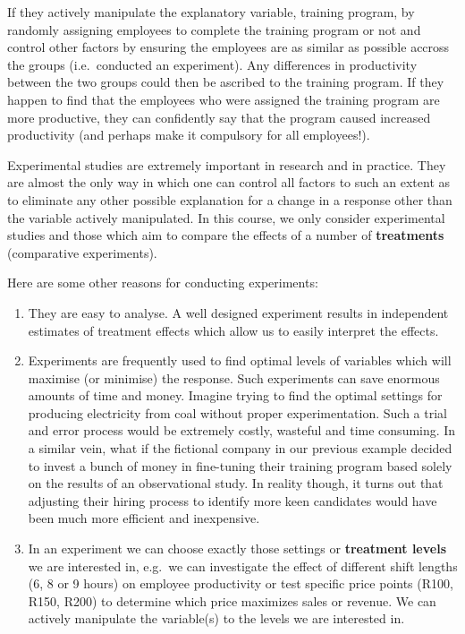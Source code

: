 \documentclass[
  letterpaper,
]{book}
\begin{document}
If they actively manipulate the explanatory variable, training program,
by randomly assigning employees to complete the training program or not
and control other factors by ensuring the employees are as similar as
possible accross the groups (i.e.~conducted an experiment). Any
differences in productivity between the two groups could then be
ascribed to the training program. If they happen to find that the
employees who were assigned the training program are more productive,
they can confidently say that the program caused increased productivity
(and perhaps make it compulsory for all employees!).

Experimental studies are extremely important in research and in
practice. They are almost the only way in which one can control all
factors to such an extent as to eliminate any other possible explanation
for a change in a response other than the variable actively manipulated.
In this course, we only consider experimental studies and those which
aim to compare the effects of a number of \textbf{treatments}
(comparative experiments).

Here are some other reasons for conducting experiments:

\begin{enumerate}
\def\labelenumi{\arabic{enumi}.}
\item
  They are easy to analyse. A well designed experiment results in
  independent estimates of treatment effects which allow us to easily
  interpret the effects.
\item
  Experiments are frequently used to find optimal levels of variables
  which will maximise (or minimise) the response. Such experiments can
  save enormous amounts of time and money. Imagine trying to find the
  optimal settings for producing electricity from coal without proper
  experimentation. Such a trial and error process would be extremely
  costly, wasteful and time consuming. In a similar vein, what if the
  fictional company in our previous example decided to invest a bunch of
  money in fine-tuning their training program based solely on the
  results of an observational study. In reality though, it turns out
  that adjusting their hiring process to identify more keen candidates
  would have been much more efficient and inexpensive.
\item
  In an experiment we can choose exactly those settings or
  \textbf{treatment levels} we are interested in, e.g.~we can
  investigate the effect of different shift lengths (6, 8 or 9 hours) on
  employee productivity or test specific price points (R100, R150, R200)
  to determine which price maximizes sales or revenue. We can actively
  manipulate the variable(s) to the levels we are interested in.
\end{enumerate}
\end{document}
